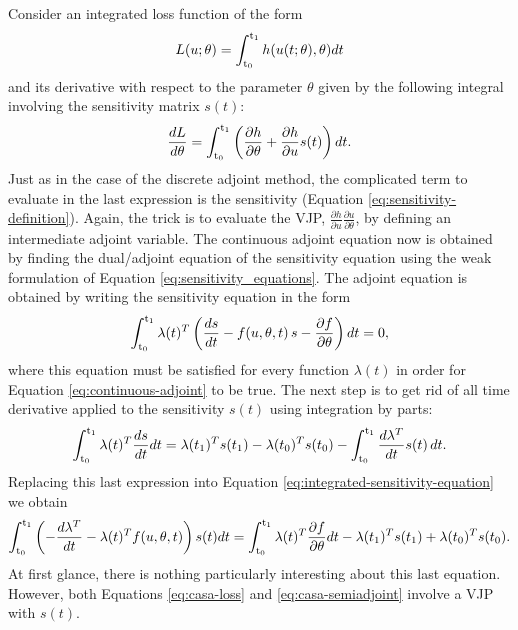 Consider an integrated loss function of the form 
\begin{equation}
    L(u; \theta) = \operatorname{\int_{t_0}^{t_1}} h(u(t;\theta), \theta) dt
\end{equation}
and its derivative with respect to the parameter $\theta$ given by the following integral involving the sensitivity matrix $s(t)$:
\begin{equation}
    \frac{dL}{d\theta}
    = 
    \operatorname{\int_{t_0}^{t_1}} \left( \frac{\partial h}{\partial \theta} + \frac{\partial h}{\partial u} s(t) \right) dt.
    \label{eq:casa-loss}
\end{equation}
Just as in the case of the discrete adjoint method, the complicated term to evaluate in the last expression is the sensitivity (Equation \eqref{eq:sensitivity-definition}).
Again, the trick is to evaluate the VJP, $\frac{\partial h}{\partial u} \frac{\partial u}{\partial \theta}$, by defining an intermediate adjoint variable. 
The continuous adjoint equation now is obtained by finding the dual/adjoint equation of the sensitivity equation using the weak formulation of Equation \eqref{eq:sensitivity_equations}. 
The adjoint equation is obtained by writing the sensitivity equation in the form 
\begin{equation}
    \operatorname{\int_{t_0}^{t_1}} \lambda(t)^T \left( \frac{ds}{dt} - f(u, \theta, t) \, s - \frac{\partial f}{\partial \theta}  \right) dt 
    = 
    0,
    \label{eq:integrated-sensitivity-equation}
\end{equation}
where this equation must be satisfied for every function $\lambda(t)$ in order for Equation \eqref{eq:continuous-adjoint} to be true. 
The next step is to get rid of all time derivative applied to the sensitivity $s(t)$ using integration by parts: 
\begin{equation}
    \operatorname{\int_{t_0}^{t_1}} \lambda(t)^T \frac{ds}{dt} dt
    = 
    \lambda(t_1)^T s(t_1) - \lambda(t_0)^T s(t_0)
    -
    \operatorname{\int_{t_0}^{t_1}} \frac{d\lambda^T}{dt} s(t)\, dt.
\end{equation}
Replacing this last expression into Equation \eqref{eq:integrated-sensitivity-equation} we obtain 
\begin{equation}
    \operatorname{\int_{t_0}^{t_1}} \left( - \frac{d\lambda^T}{dt} -  \lambda(t)^T f(u, \theta, t) \right) s(t) dt
    =
    \operatorname{\int_{t_0}^{t_1}} \lambda(t)^T \frac{\partial f}{\partial \theta} dt 
    - 
    \lambda(t_1)^T s(t_1)
    + 
    \lambda(t_0)^T s(t_0).
    \label{eq:casa-semiadjoint}
\end{equation}
At first glance, there is nothing particularly interesting about this last equation. 
However, both Equations \eqref{eq:casa-loss} and \eqref{eq:casa-semiadjoint} involve a VJP with $s(t)$. 
